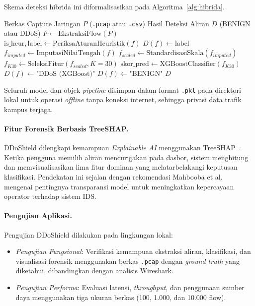 \documentclass[conference,a4paper]{IEEEtran}
\begin{document}
Skema deteksi hibrida ini diformalisasikan pada Algoritma~\ref{alg:hibrida}.

\begin{algorithm}[htbp]
\caption{Skema Deteksi Hibrida DDoShield}
\label{alg:hibrida}
\begin{algorithmic}[1]
\scriptsize
\REQUIRE Berkas Capture Jaringan $P$ (\texttt{.pcap} atau \texttt{.csv})
\ENSURE Hasil Deteksi Aliran $D$ (BENIGN atau DDoS)
\STATE $F \leftarrow \text{EkstraksiFlow}(P)$ 
    \STATE $\text{is\_heur}, \text{label} \leftarrow \text{PeriksaAturanHeuristik}(f)$
        \STATE $D(f) \leftarrow \text{label}$ 
    \ELSE
        \STATE $f_{imputed} \leftarrow \text{ImputasiNilaiTengah}(f)$ 
        \STATE $f_{scaled} \leftarrow \text{StandardisasiSkala}(f_{imputed})$ 
        \STATE $f_{K30} \leftarrow \text{SeleksiFitur}(f_{scaled}, K=30)$ 
        \STATE $\text{skor\_pred} \leftarrow \text{XGBoostClassifier}(f_{K30})$
            \STATE $D(f) \leftarrow \text{"DDoS (XGBoost)"}$
        \ELSE
            \STATE $D(f) \leftarrow \text{"BENIGN"}$
        \ENDIF
    \ENDIF
\ENDFOR
\RETURN $D$
\end{algorithmic}
\end{algorithm}

Seluruh model dan objek \textit{pipeline} disimpan dalam format \texttt{.pkl} pada direktori lokal untuk operasi \textit{offline} tanpa koneksi internet, sehingga privasi data trafik kampus terjaga.

\paragraph{Fitur Forensik Berbasis TreeSHAP.}
DDoShield dilengkapi kemampuan \textit{Explainable AI} menggunakan TreeSHAP~\cite{ref_interp,ref_wei2021}. Ketika pengguna memilih aliran mencurigakan pada dasbor, sistem menghitung dan memvisualisasikan lima fitur dominan yang melatarbelakangi keputusan klasifikasi. Pendekatan ini sejalan dengan rekomendasi Mahbooba et al.~\cite{ref_mahbooba2021} mengenai pentingnya transparansi model untuk meningkatkan kepercayaan operator terhadap sistem IDS.

\paragraph{Pengujian Aplikasi.}
Pengujian DDoShield dilakukan pada lingkungan lokal:
\begin{itemize}
    \item \textit{Pengujian Fungsional}: Verifikasi kemampuan ekstraksi aliran, klasifikasi, dan visualisasi forensik menggunakan berkas \texttt{.pcap} dengan \textit{ground truth} yang diketahui, dibandingkan dengan analisis Wireshark.
    \item \textit{Pengujian Performa}: Evaluasi latensi, \textit{throughput}, dan penggunaan sumber daya menggunakan tiga ukuran berkas (100, 1.000, dan 10.000 flow).
\end{itemize}
\end{document}
